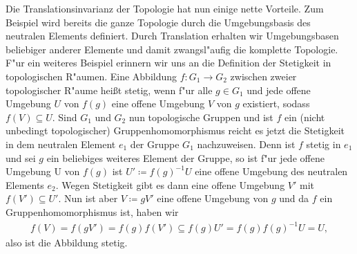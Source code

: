 	Die Translationsinvarianz der Topologie hat nun einige nette Vorteile.
	Zum Beispiel wird bereits die ganze Topologie durch die Umgebungsbasis des neutralen Elements definiert.
	Durch Translation erhalten wir Umgebungsbasen beliebiger anderer Elemente und damit zwangsl"aufig die komplette Topologie.
	F"ur ein weiteres Beispiel erinnern wir uns an die Definition der Stetigkeit in topologischen R"aumen.
	Eine Abbildung $f: G_1 \to G_2$ zwischen zweier topologischer R"aume heißt stetig, wenn f"ur alle $g\in G_1$ und jede offene Umgebung $U$ von $f(g)$ eine offene Umgebung $V$ von $g$ existiert, sodass $f(V)\subseteq U$.
	Sind $G_1$ und $G_2$ nun topologische Gruppen und ist $f$ ein (nicht unbedingt topologischer) Gruppenhomomorphismus reicht es jetzt die Stetigkeit in dem neutralen Element $e_1$ der Gruppe $G_1$ nachzuweisen.
	Denn ist $f$ stetig in $e_1$ und sei $g$ ein beliebiges weiteres Element der Gruppe, so ist f"ur jede offene Umgebung U von $f(g)$ ist $U'\coloneqq f(g)^{-1}U$ eine offene Umgebung des neutralen Elements $e_2$. 
	Wegen Stetigkeit gibt es dann eine offene Umgebung $V'$ mit $f(V') \subseteq U'$.
	Nun ist aber $V\coloneqq  gV'$ eine offene Umgebung von $g$ und da $f$ ein Gruppenhomomorphismus ist, haben wir
	\begin{align*}
		f(V) = f(gV') = f(g)f(V') \subseteq f(g) U' =f(g)f(g)^{-1} U = U,
	\end{align*}
	also ist die Abbildung stetig.
	
